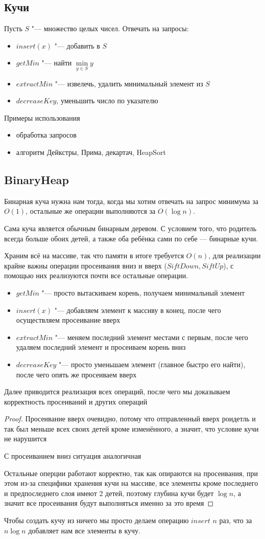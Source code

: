 \documentclass[a4paper, 12pt]{article}
\theoremstyle{plain}
\theoremstyle{definition}
\theoremstyle{remark}
\newcommand{\aritem}{\item[$\hookrightarrow$]}
\begin{document}
\subsection{Кучи}
Пусть $S$ "--- множество целых чисел. Отвечать на запросы:
\begin{itemize}
	\aritem $insert(x)$ "--- добавить в $S$
	\aritem $getMin$ "--- найти $\min\limits_{y\in S}y$
	\aritem $extractMin$ "--- извелечь, удалить минимальный элемент из $S$
	\aritem $decreaseKey$, уменьшить число по указателю
\end{itemize}
Примеры использования
\begin{itemize}
	\item обработка запросов
	\item алгоритм Дейкстры, Прима, декартач, HeapSort
\end{itemize}
\subsection{BinaryHeap}
Бинарная куча нужна нам тогда, когда мы хотим отвечать на запрос минимума за $O(1)$, остальные же операции выполняются за $O(\log n)$. 

 Сама куча является обычным бинарным деревом. С условием того, что родитель всегда больше обоих детей, а также оба ребёнка сами по себе --- бинарные кучи.
 
 Храним всё на массиве, так что памяти в итоге требуется $O(n)$, для реализации крайне важны операции просеивания вниз и вверх ($SiftDown, SiftUp$), с помощью них реализуются почти все остальные операции.
 
 \begin{itemize}
 	\aritem $getMin$ "--- просто вытаскиваем корень, получаем минимальный элемент
 	\aritem $insert(x)$ "--- добавляем элемент к массиву в конец, после чего осуществляем просеивание вверх
 	\aritem $extractMin$ "--- меняем последний элемент местами с первым, после чего удаляем последний элемент и просеиваем корень вниз
 	\aritem $decreaseKey$ "--- просто уменьшаем элемент (главное быстро его найти), после чего опять же просеиваем вверх
 \end{itemize}
Далее приводится реализация всех операций, после чего мы доказываем корректность просеиваний и других операций
\begin{proof}
	Просеивание вверх очевидно, потому что отправленный вверх роидетль и так был меньше всех своих детей кроме изменённого, а значит, что условие кучи не нарушится
	
	С просеиванием вниз ситуация аналогичная
	
	Остальные оперции работают корректно, так как опираются на просеивания, при этом из-за специфики хранения кучи на массиве, все элементы кроме последнего и предпоследнего слоя имеют 2 детей, поэтому глубина кучи будет $\log n$, а значит все просеивания будут выполняться именно за это время
\end{proof}
Чтобы создать кучу из ничего мы просто делаем операцию $insert$ $n$ раз, что за $n\log n$ добавляет нам все элементы в кучу.
\end{document}
